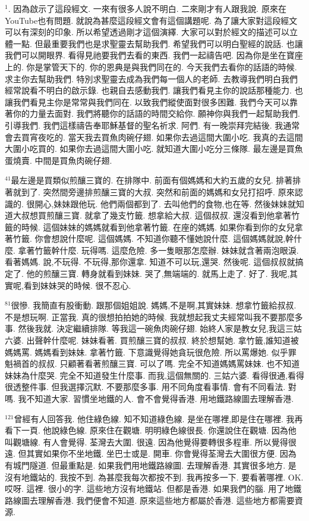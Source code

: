 \documentclass{book}
\begin{document}
$^{1}$.
因為啟示了這段經文.
一來有很多人說不明白.
二來剛才有人跟我說.
原來在YouTube也有問題.
就說為甚麼這段經文會有這個講題呢.
為了讓大家對這段經文可以有深刻的印象.
所以希望透過剛才這個演繹.
大家可以對於經文的描述可以立體一點.
但最重要我們也是求聖靈去幫助我們.
希望我們可以明白聖經的說話.
也讓我們可以開眼界.
看得見祂要我們去看的東西.
我們一起禱告吧.
因為你是坐在寶座上的.
你是掌管天下的.
你的恩典是與我們同在的.
今天我們去看你的話語的時候.
求主你去幫助我們.
特別求聖靈去成為我們每一個人的老師.
去教導我們明白我們經常說看不明白的啟示錄.
也親自去感動我們.
讓我們看見主你的說話那種能力.
也讓我們看見主你是常常與我們同在.
以致我們縱使面對很多困難.
我們今天可以靠著你的力量去面對.
我們將聽你的話語的時間交給你.
願神你與我們一起幫助我們.
引導我們.
我們這樣禱告奉耶穌基督的聖名祈求.
阿們.
有一晚崇拜完結後.
我通常會去買宵夜吃的.
當天我去買魚肉碗仔翅.
如果你去過這間大圍小吃.
我真的去這間大圍小吃買的.
如果你去過這間大圍小吃.
就知道大圍小吃分三條隊.
最左邊是買魚蛋燒賣.
中間是買魚肉碗仔翅.

$^{41}$最左邊是買類似煎釀三寶的.
在排隊中.
前面有個媽媽和大約五歲的女兒.
排著排著就到了.
突然間旁邊排煎釀三寶的大叔.
突然和前面的媽媽和女兒打招呼.
原來認識的.
很開心,妹妹跟他玩.
他們兩個都到了.
去叫他們的食物,也在等.
然後妹妹就知道大叔想買煎釀三寶.
就拿了幾支竹籤.
想拿給大叔.
這個叔叔.
還沒看到他拿著竹籤的時候.
這個妹妹的媽媽就看到他拿著竹籤.
在座的媽媽.
如果你看到你的女兒拿著竹籤.
你會想說什麼呢.
這個媽媽.
不知道你聽不懂她說什麼.
這個媽媽就說,幹什麼.
拿著竹籤幹什麼.
玩得嗎.
這麼危險.
多一隻眼那怎麼辦.
妹妹就含著兩泡眼淚.
看著媽媽.
說,不玩得.
不玩得,那你還拿.
知道不可以玩,還哭.
然後呢.
這個叔叔就搞定了.
他的煎釀三寶.
轉身就看到妹妹.
哭了,無端端的.
就馬上走了.
好了.
我呢,其實呢,看到妹妹哭的時候.
很不忍心.

$^{81}$很慘.
我簡直有股衝動.
跟那個姐姐說.
媽媽,不是啊,其實妹妹.
想拿竹籤給叔叔.
不是想玩啊.
正當我.
真的很想拍拍她的時候.
我就想起我丈夫經常叫我不要那麼多事.
然後我就.
決定繼續排隊.
等我這一碗魚肉碗仔翅.
始終人家是教女兒,我這三姑六婆.
出聲幹什麼呢.
妹妹看著.
買煎釀三寶的叔叔.
終於想幫她.
拿竹籤,誰知道被媽媽罵.
媽媽看到妹妹.
拿著竹籤.
下意識覺得她貪玩很危險.
所以罵爆她.
似乎罪魁禍首的叔叔.
只顧著看著煎釀三寶.
可以了嗎.
完全不知道媽媽罵妹妹.
也不知道妹妹為什麼哭.
完全不知道發生什麼事.
而我,這個無關的.
三姑六婆.
看得很通,看得很透整件事.
但我選擇沉默.
不要那麼多事.
用不同角度看事情.
會有不同看法.
對嗎.
我不知道大家.
習慣坐地鐵的人.
會不會覺得香港.
用地鐵路線圖去理解香港.

$^{121}$曾經有人回答我.
他住綠色線.
知不知道綠色線.
是坐在哪裡,即是住在哪裡.
我再看下一頁.
他說綠色線.
原來住在觀塘.
明明綠色線很長.
你還說住在觀塘.
因為他叫觀塘線.
有人會覺得.
荃灣去大圍.
很遠.
因為他覺得要轉很多程車.
所以覺得很遠.
但其實如果你不坐地鐵.
坐巴士或是.
開車.
你會覺得荃灣去大圍很方便.
因為有城門隧道.
但最重點是.
如果我們用地鐵路線圖.
去理解香港.
其實很多地方.
是沒有地鐵站的.
我按不到.
為甚麼我每次都按不到.
我再按多一下.
要看著哪裡.
OK.
哎呀.
這裡.
很小的字.
這些地方沒有地鐵站.
但都是香港.
如果我們的腦.
用了地鐵路線圖去理解香港.
我們便會不知道.
原來這些地方都屬於香港.
這些地方都需要資源.
\end{document}
